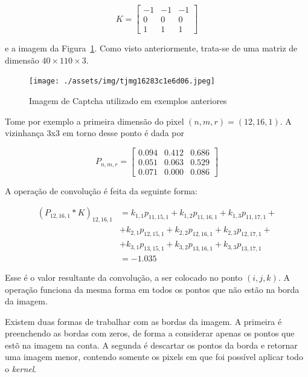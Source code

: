 \documentclass[12pt,twoside,brazilian]{book}
\begin{document}
\[
K = \left[\begin{array}{rrr}-1&-1&-1\\0&0&0\\1&1&1\end{array}\right]
\]

e a imagem da Figura~\ref{fig-tjmg-exemplo-conv}. Como visto
anteriormente, trata-se de uma matriz de dimensão
\(40\times110\times3\).

\begin{figure}

{\centering \texttt{[image: ./assets/img/tjmg16283c1e6d06.jpeg]}

}

\caption{\label{fig-tjmg-exemplo-conv}Imagem de Captcha utilizado em
exemplos anteriores}

\end{figure}

Tome por exemplo a primeira dimensão do pixel \((n,m,r) = (12,16,1)\). A
vizinhança 3x3 em torno desse ponto é dada por

\[
P_{n,m,r} = \left[\begin{array}{rrr}
0.094 & 0.412 & 0.686 \\ 
0.051 & 0.063 & 0.529 \\ 
0.071 & 0.000 & 0.086 
\end{array}\right]
\]

A operação de convolução é feita da seguinte forma:

\[
\begin{aligned}
(P_{12,16,1} *K )_{12,16,1}
&= k_{1,1}p_{11,15,1} + k_{1,2}p_{11,16,1} + k_{1,3}p_{11,17,1} + \\
&+ k_{2,1}p_{12,15,1} + k_{2,2}p_{12,16,1} + k_{2,3}p_{12,17,1} + \\
&+ k_{3,1}p_{13,15,1} + k_{3,2}p_{13,16,1} + k_{3,3}p_{13,17,1} \\
& = -1.035
\end{aligned}
\]

Esse é o valor resultante da convolução, a ser colocado no ponto
\((i,j,k)\). A operação funciona da mesma forma em todos os pontos que
não estão na borda da imagem.

Existem duas formas de trabalhar com as bordas da imagem. A primeira é
preenchendo as bordas com zeros, de forma a considerar apenas os pontos
que estõ na imagem na conta. A segunda é descartar os pontos da borda e
retornar uma imagem menor, contendo somente os pixels em que foi
possível aplicar todo o \emph{kernel}.
\end{document}
